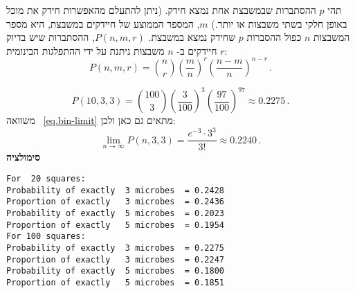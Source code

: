 תהי 
$p$
ההסתברות שבמשבצת אחת נמצא חידק. (ניתן להתעלם מהאפשרות חידק את מוכל באופן חלקי בשתי משבצות או יותר.) 
$m$,
המספר הממוצע של חיידקים במשבצת, היא מספר המשבצות
$n$
כפול ההסברות 
$p$
שחידק נמצא במשבצת. 
$P(n,m,r)$,
ההסתברות שיש בדיוק 
$r$
חיידקים ב-%
$n$
משבצות ניתנת על ידי ההתפלגות הבינומית:
\[
P(n,m,r) = {n \choose r} \left(\frac{m}{n}\right)^r \left(\frac{n-m}{n}\right)^{n-r}\,.
\]

\[
P(10,3,3) = {100 \choose 3} \left(\frac{3}{100}\right)^3 \left(\frac{97}{100}\right)^{97}\approx 0.2275\,.
\]
משוואה%
~\ref{eq.bin-limit}
מתאים גם כאן ולכן:
\[
\lim_{n\rightarrow \infty} P(n,3,3) = \frac{e^{-3}\cdot 3^3}{3!}\approx 0.2240\,.
\]
\textbf{סימולציה}
\begin{verbatim}
For  20 squares:
Probability of exactly  3 microbes  = 0.2428
Proportion of exactly   3 microbes  = 0.2436
Probability of exactly  5 microbes  = 0.2023
Proportion of exactly   5 microbes  = 0.1954
For 100 squares:
Probability of exactly  3 microbes  = 0.2275
Proportion of exactly   3 microbes  = 0.2247
Probability of exactly  5 microbes  = 0.1800
Proportion of exactly   5 microbes  = 0.1851
\end{verbatim}



